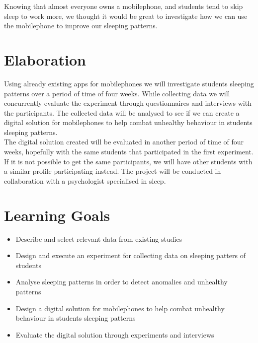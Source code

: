 \documentclass[12pt]{article}
\begin{document}
Knowing that almost everyone owns a mobilephone, and students tend to skip sleep to work more,
we thought it would be great to investigate how we can use the mobilephone to improve our 
sleeping patterns. 

\section{Elaboration}
Using already existing apps for mobilephones we will investigate students sleeping patterns over a 
period of time of four weeks. While collecting data we will concurrently evaluate the experiment through 
questionnaires and interviews with the participants. The collected data will be analysed to see if we
can create a digital solution for mobilephones to help combat unhealthy behaviour in students sleeping
patterns. \\

The digital solution created will be evaluated in another period of time of four weeks, hopefully with 
the same students that participated in the first experiment. If it is not possible to get the same 
participants, we will have other students with a similar profile participating instead. The project will be 
conducted in collaboration with a psychologist specialised in sleep. 

\section{Learning Goals}
	\begin{itemize}
		\item Describe and select relevant data from existing studies
		\item Design and execute an experiment for collecting data on sleeping patters of students
		\item Analyse sleeping patterns in order to detect anomalies and unhealthy patterns 
		\item Design a digital solution for mobilephones to help combat unhealthy behaviour in students sleeping patterns
		\item Evaluate the digital solution through experiments and interviews
	\end{itemize}
	
\end{document}
